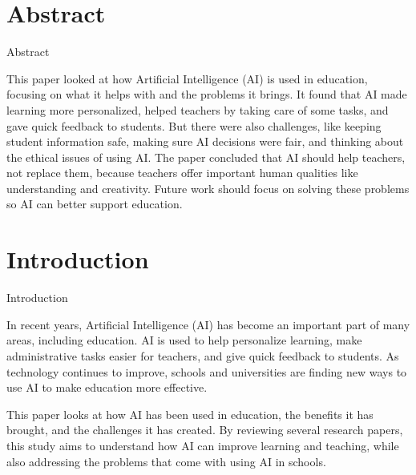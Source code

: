 \documentclass[serif, aspectratio=169]{beamer}
\begin{document}

\section{Abstract}
\begin{frame}{Abstract}

  This paper looked at how Artificial Intelligence (AI) is used in education, focusing on what it helps with and the problems it brings. It found that AI made learning more personalized, helped teachers by taking care of some tasks, and gave quick feedback to students. But there were also challenges, like keeping student information safe, making sure AI decisions were fair, and thinking about the ethical issues of using AI. The paper concluded that AI should help teachers, not replace them, because teachers offer important human qualities like understanding and creativity. Future work should focus on solving these problems so AI can better support education.

\end{frame}






\section{Introduction}

\begin{frame}{Introduction}

 In recent years, Artificial Intelligence (AI) has become an important part of many areas, including education. AI is used to help personalize learning, make administrative tasks easier for teachers, and give quick feedback to students. As technology continues to improve, schools and universities are finding new ways to use AI to make education more effective.

This paper looks at how AI has been used in education, the benefits it has brought, and the challenges it has created. By reviewing several research papers, this study aims to understand how AI can improve learning and teaching, while also addressing the problems that come with using AI in schools.

\end{frame}
\end{document}
